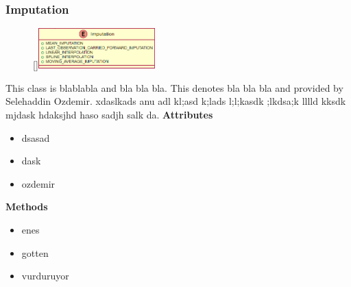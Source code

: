 \subsubsection{Imputation}
\begin{figure}
    \raisebox{0pt}[\dimexpr{}\baselineskip\relax]{\includegraphics[width=4.5cm]{classes/model-management/5.png}}
\end{figure} 
\par
This class is blablabla and bla bla bla. This denotes bla bla bla and provided by Selehaddin Ozdemir. xdaslkads anu adl kl;asd k;lads l;l;kasdk ;lkdsa;k lllld kksdk mjdask hdaksjhd haso sadjh salk da.
\newline
\newline
\textbf{Attributes}
\begin{itemize}
    \item dsasad
    \item dask
    \item ozdemir
\end{itemize}
\textbf{Methods}
\begin{itemize}
    \item enes
    \item gotten
    \item vurduruyor
\end{itemize}

